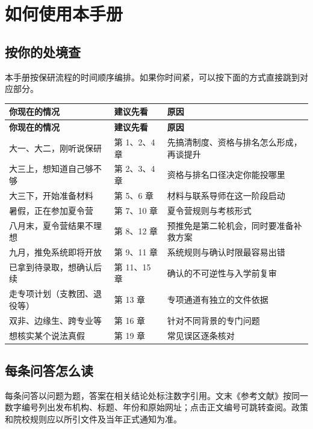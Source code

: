 \chapter*{如何使用本手册}

\section*{按你的处境查}

本手册按保研流程的时间顺序编排。如果你时间紧，可以按下面的方式直接跳到对应部分。

\begin{longtable}{p{4.6cm}p{4.0cm}p{7.6cm}}
\toprule
\textbf{你现在的情况} & \textbf{建议先看} & \textbf{原因} \\ \midrule
\endfirsthead
\toprule
\textbf{你现在的情况} & \textbf{建议先看} & \textbf{原因} \\ \midrule
\endhead
大一、大二，刚听说保研 & 第 1、2、4 章 & 先搞清制度、资格与排名怎么形成，再谈提升 \\
大三上，想知道自己够不够 & 第 2、3、4 章 & 资格与排名口径决定你能投哪里 \\
大三下，开始准备材料 & 第 5、6 章 & 材料与联系导师在这一阶段启动 \\
暑假，正在参加夏令营 & 第 7、10 章 & 夏令营规则与考核形式 \\
八月末，夏令营结果不理想 & 第 8、12 章 & 预推免是第二轮机会，同时要准备补救方案 \\
九月，推免系统即将开放 & 第 9、11 章 & 系统规则与确认时限最容易出错 \\
已拿到待录取，想确认后续 & 第 11、15 章 & 确认的不可逆性与入学前复审 \\
走专项计划（支教团、退役等） & 第 13 章 & 专项通道有独立的文件依据 \\
双非、边缘生、跨专业等 & 第 16 章 & 针对不同背景的专门问题 \\
想核实某个说法真假 & 第 19 章 & 常见误区逐条核对 \\ \bottomrule
\end{longtable}

\section*{每条问答怎么读}

每条问答以问题为题，答案在相关结论处标注数字引用。文末《参考文献》按同一数字编号列出发布机构、标题、年份和原始网址；点击正文编号可跳转查阅。政策和院校规则应以所引文件及当年正式通知为准。

